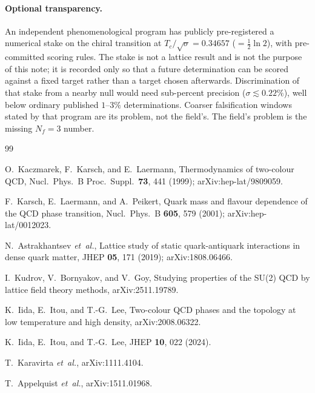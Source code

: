 \documentclass[aps,prd,twocolumn,superscriptaddress,nofootinbib,10pt]{revtex4-2}
\begin{document}
\paragraph{Optional transparency.}
An independent phenomenological program has publicly pre-registered a numerical stake on the
chiral transition at $T_c/\sqrt{\sigma}=0.34657$ ($=\tfrac12\ln 2$), with pre-committed scoring
rules. The stake is not a lattice result and is not the purpose of this note; it is recorded only
so that a future determination can be scored against a fixed target rather than a target chosen
afterwards. Discrimination of that stake from a nearby null would need sub-percent precision
($\sigma\lesssim 0.22\%$), well below ordinary published $1$--$3\%$ determinations. Coarser
falsification windows stated by that program are its problem, not the field's. The field's problem
is the missing $N_f=3$ number.

\begin{thebibliography}{99}

O.~Kaczmarek, F.~Karsch, and E.~Laermann,
Thermodynamics of two-colour QCD,
Nucl.\ Phys.\ B Proc.\ Suppl.\ \textbf{73}, 441 (1999);
arXiv:hep-lat/9809059.

F.~Karsch, E.~Laermann, and A.~Peikert,
Quark mass and flavour dependence of the QCD phase transition,
Nucl.\ Phys.\ B \textbf{605}, 579 (2001);
arXiv:hep-lat/0012023.

N.~Astrakhantsev \emph{et~al.},
Lattice study of static quark-antiquark interactions in dense quark matter,
JHEP \textbf{05}, 171 (2019);
arXiv:1808.06466.

I.~Kudrov, V.~Bornyakov, and V.~Goy,
Studying properties of the SU(2) QCD by lattice field theory methods,
arXiv:2511.19789.

K.~Iida, E.~Itou, and T.-G.~Lee,
Two-colour QCD phases and the topology at low temperature and high density,
arXiv:2008.06322.

K.~Iida, E.~Itou, and T.-G.~Lee,
JHEP \textbf{10}, 022 (2024).

T.~Karavirta \emph{et~al.},
arXiv:1111.4104.

T.~Appelquist \emph{et~al.},
arXiv:1511.01968.

\end{thebibliography}
\end{document}
